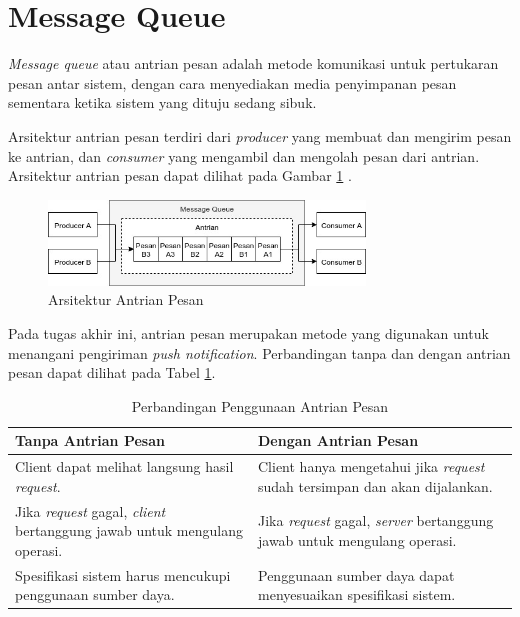 \section{Message Queue}
\par \textit{Message queue} atau antrian pesan adalah metode komunikasi untuk pertukaran pesan antar sistem, dengan cara menyediakan media penyimpanan pesan sementara ketika sistem yang dituju sedang sibuk.
\par Arsitektur antrian pesan terdiri dari \textit{producer} yang membuat dan mengirim pesan ke antrian, dan \textit{consumer} yang mengambil dan mengolah pesan dari antrian. Arsitektur antrian pesan dapat dilihat pada Gambar \ref{img:arsitektur-mq_pnt} \cite{message-queue-online}.
\begin{figure}[H]
	\centering\includegraphics[width=0.75\textwidth]{bab2/img/arsitektur-mq_pnt.jpg}
	\caption{Arsitektur Antrian Pesan}
	\label{img:arsitektur-mq_pnt}
\end{figure}
\clearpage
\par Pada tugas akhir ini, antrian pesan merupakan metode yang digunakan untuk menangani pengiriman \textit{push notification}. Perbandingan tanpa dan dengan antrian pesan dapat dilihat pada Tabel \ref{t:perbandingan-antrian-pesan}.
\begin{longtable}{|p{4.5cm}|p{4.5cm}|}
	\caption{Perbandingan Penggunaan Antrian Pesan} \label{t:perbandingan-antrian-pesan} \\ \hline
	\rowcolor{lightgray} Tanpa Antrian Pesan & Dengan Antrian Pesan \\ \hline
	Client dapat melihat langsung hasil \textit{request}. & Client hanya mengetahui jika \textit{request} sudah tersimpan dan akan dijalankan. \\ \hline
	Jika \textit{request} gagal, \textit{client} bertanggung jawab untuk mengulang operasi. & Jika \textit{request} gagal, \textit{server} bertanggung jawab untuk mengulang operasi. \\ \hline
	Spesifikasi sistem harus mencukupi penggunaan sumber daya. & Penggunaan sumber daya dapat menyesuaikan spesifikasi sistem. \\ \hline
\end{longtable}


